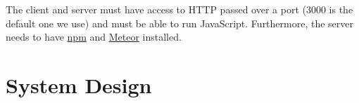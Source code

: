 \documentclass[11pt]{article} %
\begin{document}
The client and server must have access to HTTP passed over a port (3000 is the default one we use) and must be able to run JavaScript. Furthermore, the server needs to have \href{https://www.npmjs.com/}{npm} and \href{https://www.meteor.com/}{Meteor} installed.

\section{System Design}

%
%
\end{document}
